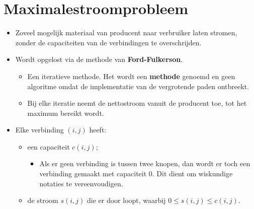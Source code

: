 \section{Maximalestroomprobleem}
\begin{itemize}
    \item Zoveel mogelijk materiaal van producent naar verbruiker laten stromen, zonder de capaciteiten van de verbindingen te overschrijden.
    \item Wordt opgelost via de methode van \textbf{Ford-Fulkerson}. 
    \begin{itemize}
        \item Een iteratieve methode. Het wordt een \textbf{methode} genoemd en geen algoritme omdat de implementatie van de vergrotende paden ontbreekt. 
        \item Bij elke iteratie neemt de nettostroom vanuit de producent toe, tot het maximum bereikt wordt.
    \end{itemize}
    \item Elke verbinding $(i, j)$ heeft:
    \begin{itemize}
        \item een capaciteit $c(i, j)$;
        \begin{itemize}
            \item  Als er geen verbinding is tussen twee knopen, dan wordt er toch een verbinding gemaakt met capaciteit 0. Dit dient om wiskundige notaties te vereenvoudigen.
        \end{itemize}
        \item de stroom $s(i, j)$ die er door loopt, waarbij $0 \leq s(i, j) \leq c(i, j)$.
        

\end{itemize}
\end{itemize}
